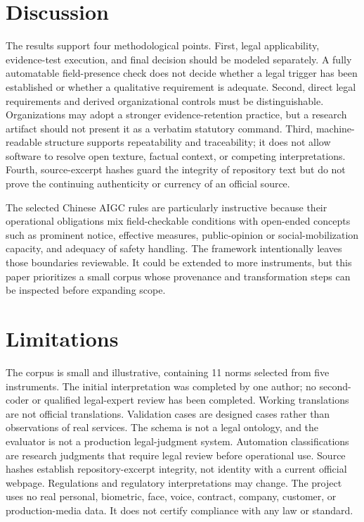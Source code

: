 \documentclass[10pt,journal]{IEEEtran}
\begin{document}
\section{Discussion}

The results support four methodological points. First, legal applicability, evidence-test execution, and final decision should be modeled separately. A fully automatable field-presence check does not decide whether a legal trigger has been established or whether a qualitative requirement is adequate. Second, direct legal requirements and derived organizational controls must be distinguishable. Organizations may adopt a stronger evidence-retention practice, but a research artifact should not present it as a verbatim statutory command. Third, machine-readable structure supports repeatability and traceability; it does not allow software to resolve open texture, factual context, or competing interpretations. Fourth, source-excerpt hashes guard the integrity of repository text but do not prove the continuing authenticity or currency of an official source.

The selected Chinese AIGC rules are particularly instructive because their operational obligations mix field-checkable conditions with open-ended concepts such as prominent notice, effective measures, public-opinion or social-mobilization capacity, and adequacy of safety handling. The framework intentionally leaves those boundaries reviewable. It could be extended to more instruments, but this paper prioritizes a small corpus whose provenance and transformation steps can be inspected before expanding scope.

\section{Limitations}

The corpus is small and illustrative, containing 11 norms selected from five instruments. The initial interpretation was completed by one author; no second-coder or qualified legal-expert review has been completed. Working translations are not official translations. Validation cases are designed cases rather than observations of real services. The schema is not a legal ontology, and the evaluator is not a production legal-judgment system. Automation classifications are research judgments that require legal review before operational use. Source hashes establish repository-excerpt integrity, not identity with a current official webpage. Regulations and regulatory interpretations may change. The project uses no real personal, biometric, face, voice, contract, company, customer, or production-media data. It does not certify compliance with any law or standard.
\end{document}
